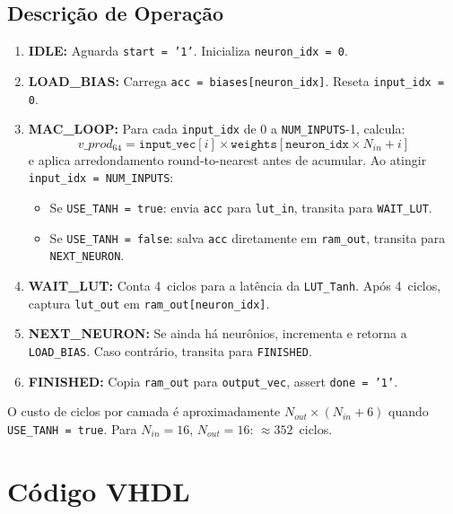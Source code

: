 \documentclass[a4paper,12pt]{article}
\begin{document}
\subsection{Descri\c{c}\~ao de Opera\c{c}\~ao}

\begin{enumerate}
    \item \textbf{IDLE:} Aguarda \texttt{start = '1'}. Inicializa \texttt{neuron\_idx = 0}.
    \item \textbf{LOAD\_BIAS:} Carrega \texttt{acc = biases[neuron\_idx]}. Reseta \texttt{input\_idx = 0}.
    \item \textbf{MAC\_LOOP:} Para cada \texttt{input\_idx} de 0 a \texttt{NUM\_INPUTS}-1, calcula:
    \[
        v\_prod_{64} = \texttt{input\_vec}[i] \times \texttt{weights}[\texttt{neuron\_idx} \times N_{in} + i]
    \]
    e aplica arredondamento round-to-nearest antes de acumular. Ao atingir \texttt{input\_idx = NUM\_INPUTS}:
    \begin{itemize}
        \item Se \texttt{USE\_TANH = true}: envia \texttt{acc} para \texttt{lut\_in}, transita para \texttt{WAIT\_LUT}.
        \item Se \texttt{USE\_TANH = false}: salva \texttt{acc} diretamente em \texttt{ram\_out}, transita para \texttt{NEXT\_NEURON}.
    \end{itemize}
    \item \textbf{WAIT\_LUT:} Conta 4~ciclos para a lat\^encia da \texttt{LUT\_Tanh}. Ap\'os 4~ciclos, captura \texttt{lut\_out} em \texttt{ram\_out[neuron\_idx]}.
    \item \textbf{NEXT\_NEURON:} Se ainda h\'a neur\^onios, incrementa e retorna a \texttt{LOAD\_BIAS}. Caso contr\'ario, transita para \texttt{FINISHED}.
    \item \textbf{FINISHED:} Copia \texttt{ram\_out} para \texttt{output\_vec}, assert \texttt{done = '1'}.
\end{enumerate}

O custo de ciclos por camada \'e aproximadamente $N_{out} \times (N_{in} + 6)$ quando \texttt{USE\_TANH = true}. Para $N_{in} = 16$, $N_{out} = 16$: $\approx 352$~ciclos.


\section{C\'odigo VHDL}
\end{document}
